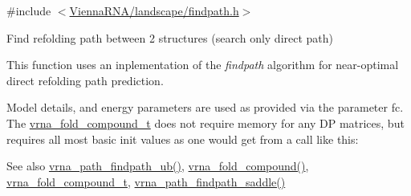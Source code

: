 {\ttfamily \#include $<$\mbox{\hyperlink{landscape_2findpath_8h}{Vienna\+R\+N\+A/landscape/findpath.\+h}}$>$}



Find refolding path between 2 structures (search only direct path) 

This function uses an inplementation of the {\itshape findpath} algorithm \cite{flamm:2001} for near-\/optimal direct refolding path prediction.

Model details, and energy parameters are used as provided via the parameter \textquotesingle{}fc\textquotesingle{}. The \mbox{\hyperlink{group__fold__compound_ga1b0cef17fd40466cef5968eaeeff6166}{vrna\+\_\+fold\+\_\+compound\+\_\+t}} does not require memory for any DP matrices, but requires all most basic init values as one would get from a call like this\+: 
\begin{DoxyCode}{0}
\end{DoxyCode}


\begin{DoxySeeAlso}{See also}
\mbox{\hyperlink{group__paths__direct_gad00765c2f269fddfa319310af22d4f67}{vrna\+\_\+path\+\_\+findpath\+\_\+ub()}}, \mbox{\hyperlink{group__fold__compound_ga6601d994ba32b11511b36f68b08403be}{vrna\+\_\+fold\+\_\+compound()}}, \mbox{\hyperlink{group__fold__compound_ga1b0cef17fd40466cef5968eaeeff6166}{vrna\+\_\+fold\+\_\+compound\+\_\+t}}, \mbox{\hyperlink{group__paths__direct_gad77dbfa125158f534147c0015a849bc3}{vrna\+\_\+path\+\_\+findpath\+\_\+saddle()}}
\end{DoxySeeAlso}

